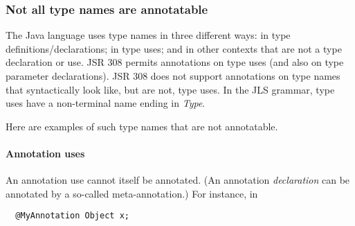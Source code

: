 \documentclass[10pt]{article}
\begin{document}


% 
% 
% 


\subsubsection{Not all type names are annotatable\label{type-names}}

The Java language uses type names in three different ways:  in type
definitions/declarations; in type uses; and in other contexts that are not
a type declaration or use.  JSR 308 permits annotations on type uses (and
also on type parameter declarations).  JSR 308 does not support annotations
on type names that syntactically look like, but are not, type uses.
In the JLS grammar, type uses have a non-terminal name ending in
\emph{Type}.

Here are examples of such type names that are not annotatable.

\paragraph{Annotation uses}
An annotation use cannot itself be annotated.  (An annotation \emph{declaration}
can be annotated by a so-called meta-annotation.)
For instance, in

\preverbnegspace
\begin{Verbatim}
  @MyAnnotation Object x;
\end{Verbatim}
\preverbnegspace
\end{document}
